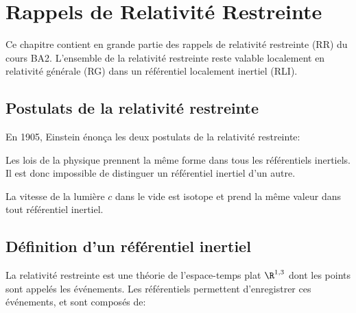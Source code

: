 \chapter{Rappels de Relativité Restreinte}
Ce chapitre contient en grande partie des rappels de relativité restreinte (RR) du cours BA2. L'ensemble de la relativité restreinte reste valable localement en relativité générale (RG) dans un référentiel localement inertiel (RLI).

\section{Postulats de la relativité restreinte}
En 1905, Einstein énonça les deux postulats de la relativité restreinte:
\begin{theoremframe}
    \begin{post}
        Les lois de la physique prennent la même forme dans tous les référentiels inertiels. Il est donc impossible de distinguer un référentiel inertiel d'un autre.
    \end{post}
\end{theoremframe}
\begin{theoremframe}
    \begin{post}
        La vitesse de la lumière $c$ dans le vide est isotope et prend la même valeur dans tout référentiel inertiel.
    \end{post}
\end{theoremframe}
\section{Définition d'un référentiel inertiel}

La relativité restreinte est une théorie de l'espace-temps plat $\R ^{1,3}$ dont les points sont appelés les événements. Les référentiels permettent d'enregistrer ces événements, et sont composés de:

